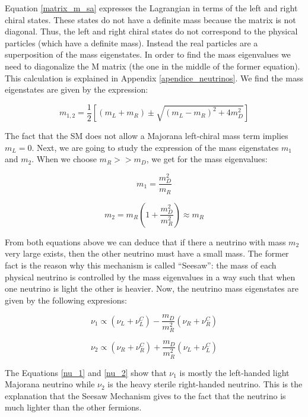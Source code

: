 Equation \ref{matrix_m_sa} expresses the Lagrangian in terms of the left and right chiral states. These states do not have a definite mass because the matrix is not diagonal. 
Thus, the left and right chiral states do not correspond to the physical particles (which have a definite mass). Instead the real particles are a superposition of the 
mass eigenstates. In order to find the mass eigenvalues we need to diagonalize the M matrix (the one in the middle of the former equation). This calculation is 
explained in Appendix \ref{apendice_neutrinos}. We find the mass eigenstates are given by the expression:

\begin{equation}
m_{1,2} = \frac{1}{2} \left[ (m_L + m_R) \pm \sqrt{(m_L - m_R)^2 + 4m_D^2} \right]
\end{equation}
 
The fact that the SM does not allow a Majorana left-chiral mass term implies $m_L = 0$. Next, we are going to study the expression of the mass eigenstates $m_1$ and $m_2$. 
When we choose $m_R >> m_D$, we get for the mass eigenvalues:

\begin{equation}
m_1 = \frac{m_D^2}{m_R}
\end{equation}

\begin{equation}
m_2 = m_R \left( 1 + \frac{m_D^2}{m_R^2}\right) \approx m_R 
\end{equation}
 
From both equations above we can deduce that if there a neutrino with mass $m_2$ very large exists, then the other neutrino must have a small mass. 
The former fact is the reason why this mechanism is called ``Seesaw'': the mass of each physical neutrino is controlled by the mass eigenvalues in a way such that when one neutrino is light
the other is heavier. Now, the neutrino mass eigenstates are given by the following expresions:

\begin{equation}
\label{nu_1}
\nu_1 \propto \left( \nu_L + \nu_L^C \right) - \frac{m_D}{m_R^2} \left( \nu_R + \nu_R^C \right)
\end{equation}

\begin{equation}
\label{nu_2}
\nu_2 \propto \left( \nu_R + \nu_R^C \right) + \frac{m_D}{m_R^2} \left( \nu_L + \nu_L^C \right)
\end{equation}

The Equations \ref{nu_1} and \ref{nu_2} show that $\nu_1$ is mostly the left-handed light Majorana neutrino while $\nu_2$ is the heavy sterile right-handed neutrino. This is the explanation 
that the Seesaw Mechanism gives to the fact that the neutrino is much lighter than the other fermions. 
 
 
 
 
 
 